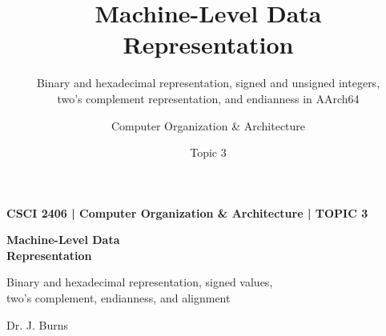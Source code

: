 \documentclass[aspectratio=169,11pt,t]{beamer}
\title[Topic 3]{
  Machine-Level Data Representation
}
\subtitle{
  Binary and hexadecimal representation, signed and unsigned integers,\\
  two's complement representation, and endianness in AArch64
}
\author{
  Computer Organization \& Architecture
}
\date{Topic 3}
\begin{document}





\begin{frame}[plain]

\vspace*{\fill}

\begin{minipage}{0.88\textwidth}
{\color{gold}\normalsize\bfseries
CSCI 2406 \;|\; Computer Organization \& Architecture \;|\; TOPIC 3
\par}

\vspace{0.25cm}

{\color{white}\fontsize{24}{28}\selectfont\bfseries
Machine-Level Data\\[0.08cm]Representation
\par}

\vspace{0.35cm}

{\color{white!80}\large
Binary and hexadecimal representation, signed values,\\two's complement, endianness, and alignment
\par}
\end{minipage}

\vfill

{\color{white!70}\small
Dr. J. Burns
\par}

\vspace*{\fill}
\end{frame}





\end{document}
